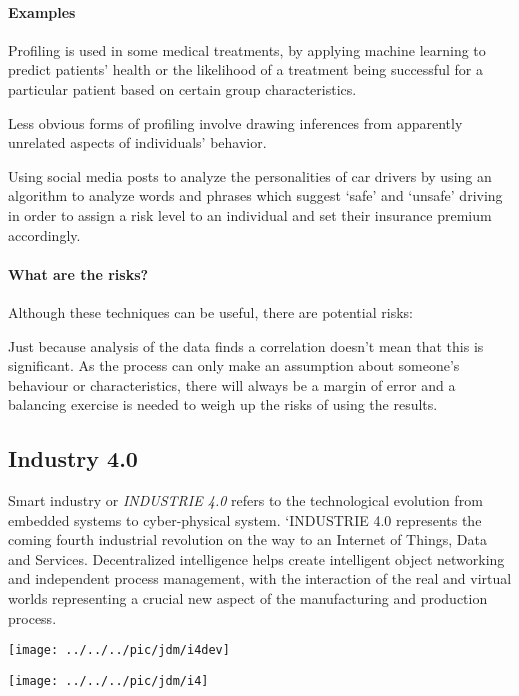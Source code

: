 \paragraph{Examples}
Profiling is used in some medical treatments, by applying machine learning to predict patients’ health or the likelihood of a treatment being successful for a particular patient based on certain group characteristics.

Less obvious forms of profiling involve drawing inferences from apparently unrelated aspects of individuals’ behavior.

Using social media posts to analyze the personalities of car drivers by using an algorithm to analyze words and phrases which suggest ‘safe’ and ‘unsafe’ driving in order to assign a risk level to an individual and set their insurance premium accordingly.


\pbn
\paragraph{What are the risks?}

Although these techniques can be useful, there are potential risks:

Just because analysis of the data finds a correlation doesn’t mean that this is significant. As the process can only make an assumption about someone’s behaviour or characteristics, there will always be a margin of error and a balancing exercise is needed to weigh up the risks of using the results. 

\pbn
\subsection{Industry 4.0}
Smart industry or \textit{INDUSTRIE 4.0} refers to the technological evolution from embedded systems to cyber-physical system. `INDUSTRIE 4.0 represents the coming fourth industrial revolution on the way to an Internet of Things, Data and Services. Decentralized intelligence helps create intelligent object networking and independent process management, with the interaction of the real and virtual worlds representing a crucial new aspect of the manufacturing and production process.



\begin{center}
	
	\texttt{[image: ../../../pic/jdm/i4dev]}
\end{center}

\begin{center}
	
	\texttt{[image: ../../../pic/jdm/i4]}
\end{center}


%
%	








